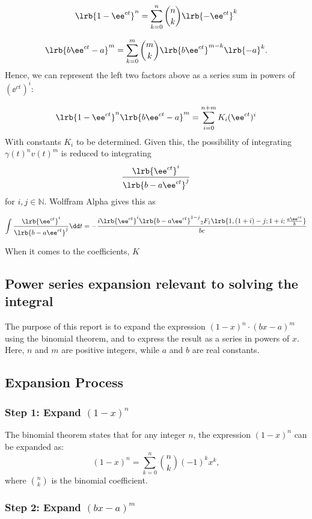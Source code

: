 $$\lrb{1 - \ee^{ct}}^n  = \sum_{k=0}^n {n\choose k} \lrb{-\ee^{ct}}^k$$

$$\lrb{b\ee^{ct} - a}^m = \sum_{k=0}^m {m\choose k }\lrb{b \ee^{ct}}^{m-k} \lrb{-a}^k.$$
Hence, we can represent the left two factors above as a series sum in powers of $(\ee^{ct})^i$:

$$\lrb{1 - \ee^{ct}}^n\lrb{b \ee^{ct} - a}^m  = \sum_{i=0}^{n+m} K_i (\ee^{ct})^i$$
With constants $K_i$ to be determined. Given this, the possibility of integrating $\gamma(t)^n v(t)^m $ is reduced to integrating 
$$\frac{\lrb{\ee^{ct}}^i}{ \lrb{b - a\ee^{ct}}^j  }$$
for $i, j \in \mathbb{N}$. Wolffram Alpha gives this as 

$$\int \frac{\lrb{\ee^{ct}} ^i}{\lrb{b - a\ee^{ct}} ^j} \dd t  = -\frac{i \lrb{\ee^{ct}}^i  \lrb{b-a \ee^{ct}}^{1-j}    {}_2F_1\lrb{1, (1+i) - j; 1 + i; \frac{a\ee^{ct}}{b}}   }{bc}$$




When it comes to the coefficients, $K$


\subsection*{Power series expansion relevant to solving the integral}

The purpose of this report is to expand the expression \((1-x)^n \cdot (bx - a)^m\) using the binomial theorem, and to express the result as a series in powers of \(x\). Here, \(n\) and \(m\) are positive integers, while \(a\) and \(b\) are real constants.

\subsection*{Expansion Process}

\subsubsection*{Step 1: Expand \((1-x)^n\)}

The binomial theorem states that for any integer \(n\), the expression \((1-x)^n\) can be expanded as:
\begin{equation}
(1-x)^n = \sum_{k=0}^{n} \binom{n}{k} (-1)^k x^k,
\end{equation}
where \(\binom{n}{k}\) is the binomial coefficient.

\subsubsection*{Step 2: Expand \((bx - a)^m\)}


